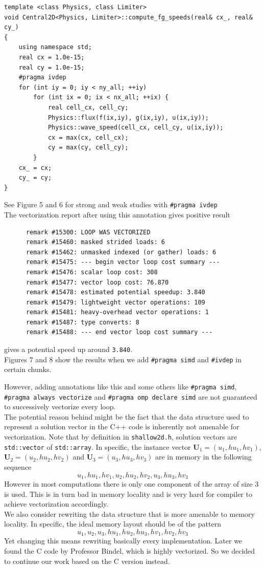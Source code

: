 \documentclass[12pt]{article}
\numberwithin{equation}{section}
\begin{document}
\scriptsize
\begin{lstlisting}
template <class Physics, class Limiter>
void Central2D<Physics, Limiter>::compute_fg_speeds(real& cx_, real& cy_)
{
    using namespace std;
    real cx = 1.0e-15;
    real cy = 1.0e-15;
    #pragma ivdep
    for (int iy = 0; iy < ny_all; ++iy)
        for (int ix = 0; ix < nx_all; ++ix) {
            real cell_cx, cell_cy;
            Physics::flux(f(ix,iy), g(ix,iy), u(ix,iy));
            Physics::wave_speed(cell_cx, cell_cy, u(ix,iy));
            cx = max(cx, cell_cx);
            cy = max(cy, cell_cy);
        }
    cx_ = cx;
    cy_ = cy;
}
\end{lstlisting}
\normalsize
See Figure 5 and 6 for strong and weak studies with \texttt{\#pragma ivdep}
\\
The vectorization report after using this annotation gives positive result

\scriptsize
\begin{lstlisting}
      remark #15300: LOOP WAS VECTORIZED
      remark #15460: masked strided loads: 6
      remark #15462: unmasked indexed (or gather) loads: 6
      remark #15475: --- begin vector loop cost summary ---
      remark #15476: scalar loop cost: 308
      remark #15477: vector loop cost: 76.870
      remark #15478: estimated potential speedup: 3.840
      remark #15479: lightweight vector operations: 109
      remark #15481: heavy-overhead vector operations: 1
      remark #15487: type converts: 8
      remark #15488: --- end vector loop cost summary ---
\end{lstlisting}
\normalsize
gives a potential speed up around \texttt{3.840}.
\\
Figures 7 and 8 show the results when we add \texttt{\#pragma simd} and
\texttt{\#ivdep} in certain chunks.

However, adding annotations like this and some others like \texttt{\#pragma simd},
\texttt{\#pragma always vectorize} and \texttt{\#pragma omp declare simd} are not
guaranteed to successively vectorize every loop.
\\
The potential reason behind might be the fact that the data structure used to represent a solution vector in the C++ code is inherently not amenable for vectorization.
Note that by definition in \texttt{shallow2d.h}, solution vectors are \texttt{std::vector} of \texttt{std::array}. In specific, the instance vector $\mathbf{U}_1 = \left( u_1, hu_1, hv_1  \right)$, $\mathbf{U}_2 = \left( u_2, hu_2, hv_2 \right)$ and $\mathbf{U}_3 = \left( u_3, hu_3, hv_3 \right)$ are in memory in the following sequence
\[
 u_1, hu_1, hv_1, u_2, hu_2, hv_2, u_3, hu_3, hv_3
\]
However in most computations there is only one component of the array of size 3 is used. This is in turn bad in memory locality and is very hard for compiler to achieve
vectorization accordingly.
\\
We also consider rewriting the data structure that is more amenable to memory locality. In specific, the ideal memory layout should be of the pattern
\[
 u_1, u_2, u_3, hu_1, hu_2, hu_3, hv_1, hv_2, hv_3
\]
Yet changing this means rewriting basically every implementation. Later we found
the C code by Professor Bindel, which is highly vectorized. So we decided to
continue our work based on the C version instead.
\end{document}
